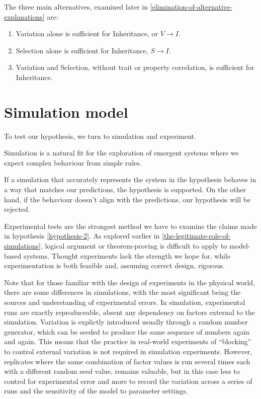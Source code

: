 The three main alternatives, examined later in \cref{elimination-of-alternative-explanations} are:

\begin{enumerate}
	\item Variation alone is sufficient for Inheritance, or $V\rightarrow I$.
	\item Selection alone is sufficient for Inheritance, $S\rightarrow I$.
	\item Variation and Selection, without trait or property correlation, is sufficient for Inheritance.
\end{enumerate}

\chapter{Simulation model}

To test our hypothesis, we turn to simulation and experiment.

Simulation is a natural fit for the exploration of emergent systems where we expect complex behaviour from simple rules. 

If a simulation that accurately represents the system in the hypothesis behaves in a way that matches our predictions, the hypothesis is supported. On the other hand, if the behaviour doesn't align with the predictions, our hypothesis will be rejected.

Experimental tests are the strongest method we have to examine the claims made in hypothesis \autoref{hypothesis-2}. As explored earlier in \cref{the-legitimate-role-of-simulations}, logical argument or theorem-proving is difficult to apply to model-based systems. Thought experiments lack the strength we hope for, while experimentation is both feasible and, assuming correct design, rigorous.

Note that for those familiar with the design of experiments in the physical world, there are some differences in simulations, with the most significant being the sources and understanding of experimental errors. In simulation, experimental runs are exactly reproduceable, absent any dependency on factors external to the simulation. Variation is explictly introduced usually through a random number generator, which can be seeded to produce the same sequence of numbers again and again. This means that the practice in real-world experiments of ``blocking'' to control external variation is not required in simulation experiments. However, \gls{replicate}s where the same combination of factor values is run several times each with a different random seed value, remains valuable, but in this case less to control for experimental error and more to record the variation across a series of runs and the sensitivity of the model to parameter settings.

